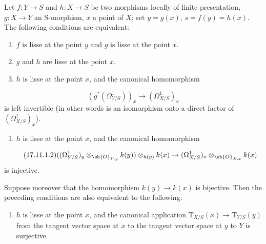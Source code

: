 \begin{theorem}[17.11.1]
\label{IV.17.11.1}
Let $f:Y\to S$ and $h:X\to S$ be two morphisms locally of finite presentation, $g:X\to Y$ an S-morphism, $x$ a point of $X$; set $y=g(x)$, $s=f(y)=h(x)$.
The following conditions are equivalent:
\begin{enumerate}
  \item[a)] $f$ is lisse at the point $y$ and $g$ is lisse at the point $x$.
  \item[b)] $g$ and $h$ are lisse at the point $x$.
  \item[c)] $h$ is lisse at the point $x$, and the canonical homomorphism 
\end{enumerate}
\begin{equation}
\label{IV.17.11.1.1}
\tag{17.11.1.1}
  (g^*(\Omega^1_{Y/S}))_x \to (\Omega^1_{X/S})_x
\end{equation}
is left invertible (in other words is an isomorphism onto a direct factor of $(\Omega^1_{X/S})_x$).
\begin{enumerate}
  \item[c')] $h$ is lisse at the point $x$, and the canonical homomorphism
\end{enumerate}
\begin{equation}
\label{IV.17.11.1.2}
\tag{17.11.1.2}
  ((\Omega^1_{Y/S})_y\otimes_{\sh{O}_{Y,y}} k(y))\otimes_{k(y)} k(x) \to (\Omega^1_{X/S})_x\otimes_{\sh{O}_{X,x}} k(x)
\end{equation}
is injective.

Suppose moreover that the homomorphism $k(y)\to k(x)$ is bijective.
Then the preceding conditions are also equivalent to the following:
\begin{enumerate}
  \item[d)] $h$ is lisse at the point $x$, and the canonical application $\mathrm{T}_{X/S}(x)\to\mathrm{T}_{Y/S}(y)$  from the tangent vector space at $x$ to the tangent vector space at $y$ to $Y$ is surjective.
\end{enumerate}
\end{theorem}


